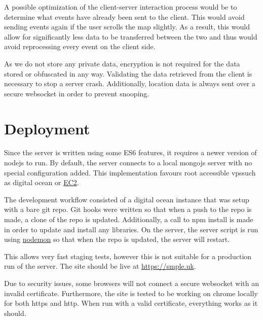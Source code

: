 \documentclass[10pt]{article}
\begin{document}
        A possible optimization of the client-server interaction process would be to determine what events have already been sent to the client. This would avoid sending events again if the user scrolls the map slightly. As a result, this would allow for significantly less data to be transferred between the two and thus would avoid reprocessing every event on the client side.

        As we do not store any private data, encryption is not required for the data stored or obfuscated in any way. Validating the data retrieved from the client is necessary to stop a server crash. Additionally, location data is always sent over a secure websocket in order to prevent snooping.

    \section{Deployment}
        Since the server is written using some ES6 features, it requires a newer version of nodejs to run. By default, the server connects to a local mongojs server with no special configuration added. This implementation favours root accessible vps\textquotesingle  such as digital ocean or \href{https://aws.amazon.com/ec2/}{EC2}.

        The development workflow consisted of a digital ocean instance that was setup with a bare git repo. Git hooks were written so that when a push to the repo is made, a clone of the repo is updated. Additionally, a call to npm install is made in order to update and install any libraries. On the server, the server script is run using \href{https://github.com/remy/nodemon}{nodemon} so that when the repo is updated, the server will restart.  

        This allows very fast staging tests, however this is not suitable for a production run of the server. The site should be live at \href{https://smple.uk}{https://smple.uk}.

        Due to security issues, some browsers will not connect a secure websocket with an invalid certificate. Furthermore, the site is tested to be working on chrome locally for both https and http. When run with a valid certificate, everything works as it should.
\end{document}

